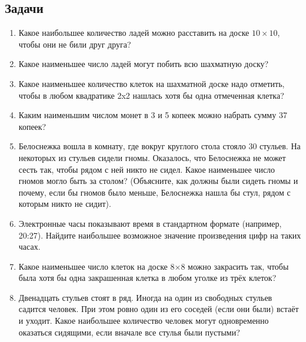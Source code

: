\documentclass[a4paper,12pt]{article}
\begin{document}
\subsection*{Задачи}
    \begin{enumerate}
        \item Какое наибольшее количество ладей можно расставить на доске $10 \times 10$, чтобы они не били друг друга?
        \item Какое наименьшее число ладей могут побить всю шахматную доску?
        \item Какое наименьшее количество клеток на шахматной доске надо отметить, чтобы в любом квадратике 2x2 нашлась хотя бы одна отмеченная клетка?
        \item Каким наименьшим числом монет в 3 и 5 копеек можно набрать сумму 37 копеек? 
        \item Белоснежка вошла в комнату, где вокруг круглого стола стояло 30 стульев. На некоторых из стульев сидели гномы. Оказалось, что Белоснежка не может сесть так, чтобы рядом с ней никто не сидел. Какое наименьшее число гномов могло быть за столом? (Объясните, как должны были сидеть гномы и почему, если бы гномов было меньше, Белоснежка нашла бы стул, рядом с которым никто не сидит).
        \item Электронные часы показывают время в стандартном формате (например, 20:27). Найдите наибольшее возможное значение произведения цифр на таких часах.
        \item Какое наименьшее число клеток на доске 8×8 можно закрасить так, чтобы была хотя бы одна закрашенная клетка в любом уголке из трёх клеток?
        \item Двенадцать стульев стоят в ряд. Иногда на один из свободных стульев садится человек. При этом ровно один из его соседей (если они были) встаёт и уходит. Какое наибольшее количество человек могут одновременно оказаться сидящими, если вначале все стулья были пустыми?
    \end{enumerate}
\end{document}
